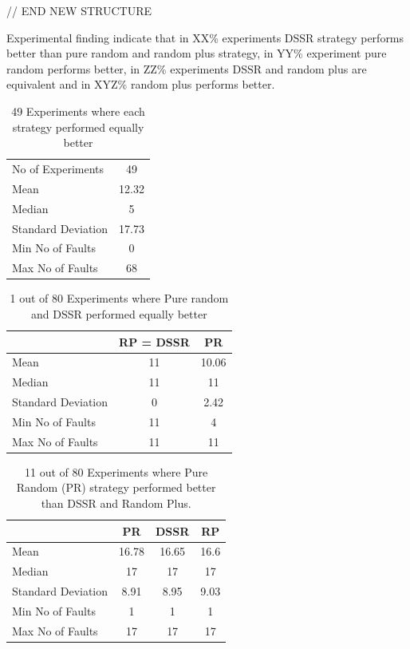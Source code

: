 \documentclass[conference]{IEEEtran}
\begin{document}
// END NEW STRUCTURE

Experimental finding indicate that in XX\% experiments DSSR strategy performs better than pure random and random plus strategy, in YY\% experiment pure random performs better, in ZZ\% experiments DSSR and random plus are equivalent and in XYZ\% random plus performs better. 



\begin{table}[H]
\caption{49 Experiments where each strategy performed equally better}
\centering
\begin{tabular}{|l|c|}
\hline\hline
No of Experiments 	& 49  	\\
Mean  			& 12.32  	\\
Median 			& 5 		\\
Standard Deviation 	& 17.73  	\\
Min No of Faults	&  0  		\\
Max No of Faults 	& 68  	\\
\hline
\end{tabular}
\label{table:nonlin}
\end{table}





\begin{table}[H]
\caption{1 out of 80 Experiments where Pure random and DSSR performed equally better}
\centering
\begin{tabular}{|l|c|c|}
\hline\hline
 				& RP = DSSR			&  PR \\[1ex]
\hline
Mean  			&    11				&  10.06\\
Median 			&    11 				&  11\\
Standard Deviation 	&    0					&  2.42\\
Min No of Faults	&    11				&  4\\
Max No of Faults 	&    11				&  11\\
\hline
\end{tabular}
\label{table:result5}
\end{table}








\begin{table}[H]
\caption{11 out of 80 Experiments where Pure Random (PR) strategy performed better than DSSR and Random Plus.}
\centering
\begin{tabular}{|l|c|c|c|}
\hline\hline
 				& PR			&  DSSR 			& RP \\[1ex]
\hline
Mean  			&    16.78		&  16.65			&  16.6\\
Median 			&    17    		&  17				&  17 \\
Standard Deviation 	&    8.91		&  8.95			&  9.03\\
Min No of Faults	&    1			&  1				&  1\\
Max No of Faults 	&    17		&  17				& 17\\
\hline
\end{tabular}
\label{table:result1}
\end{table}
\end{document}
